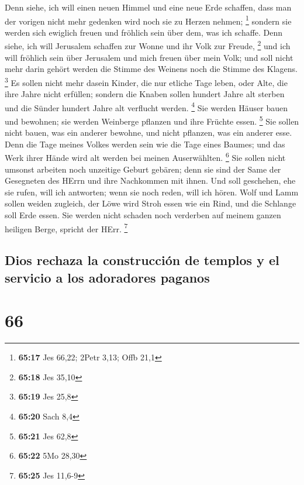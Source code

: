  Denn siehe, ich will einen neuen Himmel und eine neue
Erde schaffen, dass man der vorigen nicht mehr gedenken wird noch sie zu
Herzen nehmen; \footnote{\textbf{65:17} Jes 66,22; 2Petr 3,13; Offb 21,1}
 sondern sie werden sich ewiglich freuen und fröhlich
sein über dem, was ich schaffe. Denn siehe, ich will Jerusalem schaffen
zur Wonne und ihr Volk zur Freude, \footnote{\textbf{65:18} Jes 35,10}
 und ich will fröhlich sein über Jerusalem und mich
freuen über mein Volk; und soll nicht mehr darin gehört werden die
Stimme des Weinens noch die Stimme des Klagens. \footnote{\textbf{65:19}
  Jes 25,8}  Es sollen nicht mehr dasein Kinder, die nur
etliche Tage leben, oder Alte, die ihre Jahre nicht erfüllen; sondern
die Knaben sollen hundert Jahre alt sterben und die Sünder hundert Jahre
alt verflucht werden. \footnote{\textbf{65:20} Sach 8,4} 
Sie werden Häuser bauen und bewohnen; sie werden Weinberge pflanzen und
ihre Früchte essen. \footnote{\textbf{65:21} Jes 62,8} 
Sie sollen nicht bauen, was ein anderer bewohne, und nicht pflanzen, was
ein anderer esse. Denn die Tage meines Volkes werden sein wie die Tage
eines Baumes; und das Werk ihrer Hände wird alt werden bei meinen
Auserwählten. \footnote{\textbf{65:22} 5Mo 28,30}  Sie
sollen nicht umsonst arbeiten noch unzeitige Geburt gebären; denn sie
sind der Same der Gesegneten des HErrn und ihre Nachkommen mit ihnen.
 Und soll geschehen, ehe sie rufen, will ich antworten;
wenn sie noch reden, will ich hören.  Wolf und Lamm
sollen weiden zugleich, der Löwe wird Stroh essen wie ein Rind, und die
Schlange soll Erde essen. Sie werden nicht schaden noch verderben auf
meinem ganzen heiligen Berge, spricht der HErr. \footnote{\textbf{65:25}
  Jes 11,6-9}

\hypertarget{dios-rechaza-la-construcciuxf3n-de-templos-y-el-servicio-a-los-adoradores-paganos}{%
\subsection{Dios rechaza la construcción de templos y el servicio a los
adoradores
paganos}\label{dios-rechaza-la-construcciuxf3n-de-templos-y-el-servicio-a-los-adoradores-paganos}}

\hypertarget{section-65}{%
\section{66}\label{section-65}}

